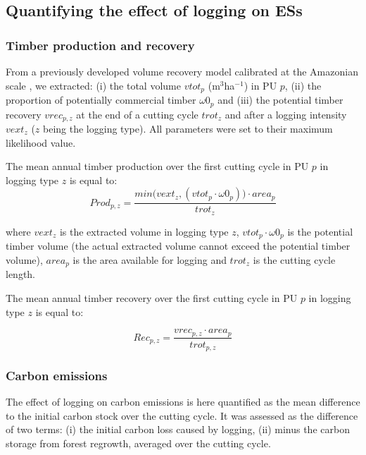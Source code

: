 \documentclass{article}
\begin{document}
\subsection{Quantifying the effect of logging on ESs}
\label{sec:ESestimation}

\subsubsection{Timber production and recovery}

From a previously developed volume recovery model calibrated at the Amazonian scale \cite{Piponiotc}, we extracted: (i) the total volume $vtot_p$ (m$^3$ha$^{-1}$) in PU $p$, (ii) the proportion of potentially commercial timber $\omega 0_p$ and (iii) the potential timber recovery $vrec_{p,z}$ at the end of a cutting cycle $trot_z$ and after a logging intensity $vext_z$ ($z$ being the logging type). All parameters were set to their maximum likelihood value.

The mean annual timber production over the first cutting cycle in PU $p$ in logging type $z$ is equal to: 
\begin{equation}
\label{eq:prod}
    Prod_{p,z}  =  \frac{min\big(vext_z, (vtot_p\cdot \omega 0_p) \big) \cdot area_p}{trot_z}
\end{equation}

where $vext_z$ is the extracted volume in logging type $z$, $vtot_p\cdot \omega 0_p$ is the potential timber volume (the actual extracted volume cannot exceed the potential timber volume), $area_p$ is the area available for logging and $trot_z$ is the cutting cycle length.

The mean annual timber recovery over the first cutting cycle in PU $p$ in logging type $z$ is equal to: 

\begin{equation}
\label{eq:rec}
    Rec_{p,z} = \frac{vrec_{p,z}\cdot area_p}{trot_{p,z}}
\end{equation}

\subsubsection{Carbon emissions}

The effect of logging on carbon emissions is here quantified as the mean difference to the initial carbon stock over the cutting cycle. It was assessed as the difference of two terms: (i) the initial carbon loss caused by logging, (ii) minus the carbon storage from forest regrowth, averaged over the cutting cycle. 
\end{document}
